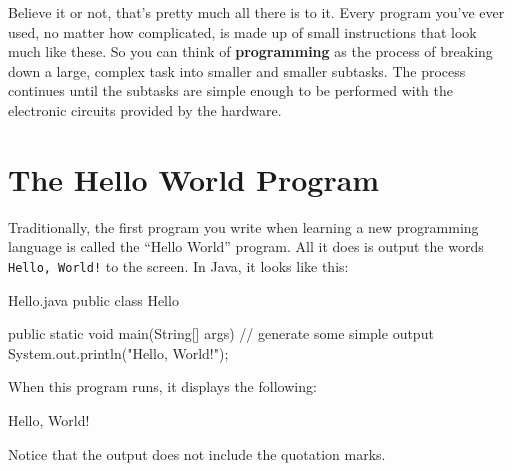 
Believe it or not, that's pretty much all there is to it.
Every program you've ever used, no matter how complicated, is made up of small instructions that look much like these.
So you can think of {\bf programming} as the process of breaking down a large, complex task into smaller and smaller subtasks.
The process continues until the subtasks are simple enough to be performed with the electronic circuits provided by the hardware.


\section{The Hello World Program}
\label{computer-programming_hello-world-program}

Traditionally, the first program you write when learning a new programming language is called the ``Hello World'' program.
All it does is output the words {\tt Hello, World!} to the screen.
In Java, it looks like this:



\begin{trinket}[235]{Hello.java}
public class Hello {

    public static void main(String[] args) {
        // generate some simple output
        System.out.println("Hello, World!");
    }
}
\end{trinket}

When this program runs, it displays the following:

\begin{stdout}
Hello, World!
\end{stdout}

Notice that the output does not include the quotation marks.



